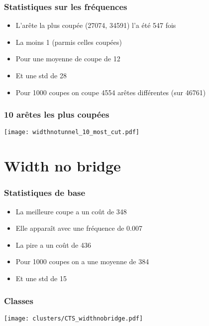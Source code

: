 \documentclass[aspectratio=169]{beamer}
\begin{document}
    \begin{frame}
        \frametitle{Statistiques sur les fréquences}

        \begin{itemize}
            \item L'arête la plus coupée (27074, 34591) l'a été 547 fois
            \item La moins 1 (parmis celles coupées)
            \item Pour une moyenne de coupe de 12
            \item Et une std de 28
            \item Pour 1000 coupes on coupe 4554 arêtes différentes (sur 46761)
        \end{itemize}
    
    \end{frame}

    \begin{frame}
        \frametitle{10 arêtes les plus coupées}
        \centering
        \texttt{[image: widthnotunnel\_10\_most\_cut.pdf]}    
    \end{frame}
    \section{Width no bridge}
    \begin{frame}
        \frametitle{Statistiques de base}
        
        \begin{itemize}
            \item La meilleure coupe a un coût de 348
            \item Elle apparaît avec une fréquence de 0.007
            \item La pire a un coût de 436
            \item Pour 1000 coupes on a une moyenne de 384
            \item Et une std de 15
        \end{itemize}

    \end{frame}

    \begin{frame}
        \frametitle{Classes}
        \centering
        \texttt{[image: clusters/CTS\_widthnobridge.pdf]}
    \end{frame}
\end{document}
